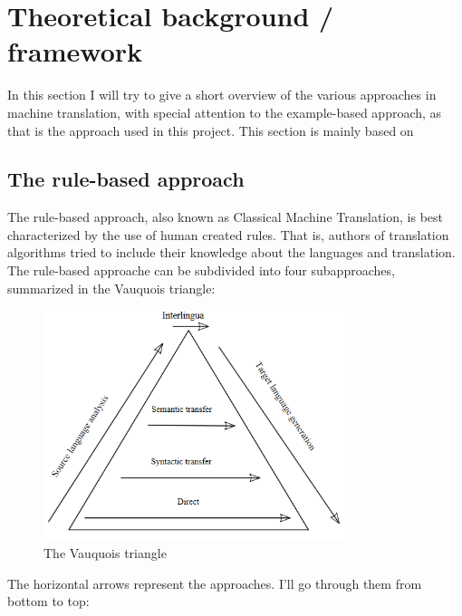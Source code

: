 \documentclass[12pt]{article}
\begin{document}
\section{Theoretical background / framework}

In this section I will try to give a short overview of the various approaches in machine translation, with special attention to the example-based approach, as that is the approach used in this project. This section is mainly based on \citet{vangompel09}

\subsection{The rule-based approach}

The rule-based approach, also known as Classical Machine Translation, is best characterized by the use of human created rules. That is, authors of translation algorithms tried to include their knowledge about the languages and translation. The rule-based approache can be subdivided into four subapproaches, summarized in the Vauquois triangle: \\

\begin{figure}[htb]
\centering
\includegraphics[width=0.8\textwidth]{vauquois.png}
\caption{The Vauquois triangle}
\label{fig:vauquois}
\end{figure}

The horizontal arrows represent the approaches. I'll go through them from bottom to top:
\end{document}
